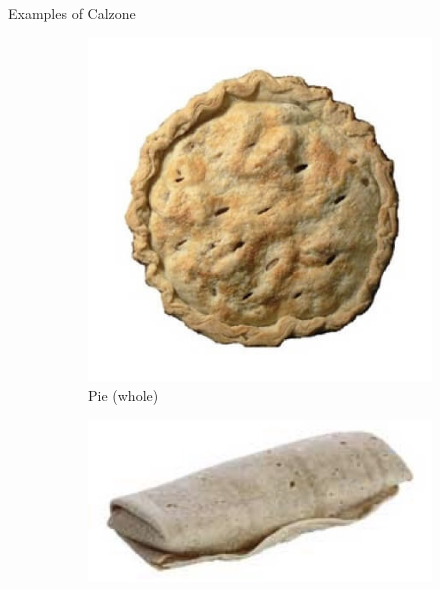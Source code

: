 \documentclass{beamer}
\begin{document}
\begin{frame}{Examples of Calzone}
    \begin{figure}
        \begin{subfigure}{.3\textwidth}
          \centering
          \includegraphics[width=.8\linewidth]{images/cube_rule_of_food/calzone/27_pie.jpg}
          \caption{\label{fig:whole-pie}Pie (whole)}
        \end{subfigure}
        \begin{subfigure}{.4\textwidth}
          \centering
          \includegraphics[width=.8\linewidth]{images/cube_rule_of_food/calzone/27_burrito.jpg}

\end{subfigure}
\end{figure}
\end{frame}
\end{document}
